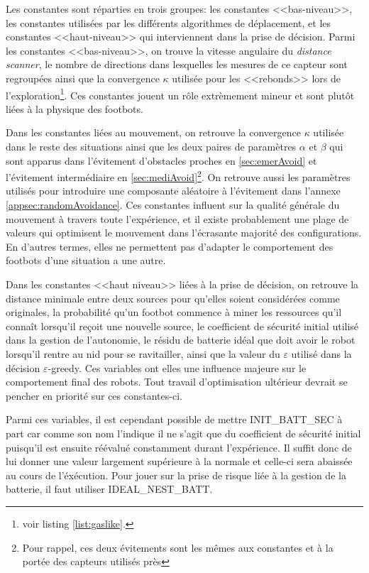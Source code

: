Les constantes sont réparties en trois groupes: les constantes <<bas-niveau>>, les constantes utilisées par les différents algorithmes de déplacement, et les constantes <<haut-niveau>> qui interviennent dans la prise de décision. Parmi les constantes <<bas-niveau>>, on trouve la vitesse angulaire du \emph{distance scanner}, le nombre de directions dans lesquelles les mesures de ce capteur sont regroupées ainsi que la convergence $\kappa$ utilisée pour les <<rebonds>> lors de l'exploration\footnote{voir listing \ref{list:gaslike}.}. Ces constantes jouent un rôle extrèmement mineur et sont plutôt liées à la physique des footbots.

Dans les constantes liées au mouvement, on retrouve la convergence $\kappa$ utilisée dans le reste des situations ainsi que les deux paires de paramètres $\alpha$ et $\beta$ qui sont apparus dans l'évitement d'obstacles proches en \ref{sec:emerAvoid} et l'évitement intermédiaire en \ref{sec:mediAvoid}\footnote{Pour rappel, ces deux évitements sont les mêmes aux constantes et à la portée des capteurs utilisés près}. On retrouve aussi les paramètres utilisés pour introduire une composante aléatoire à l'évitement dans l'annexe \ref{appsec:randomAvoidance}. Ces constantes influent sur la qualité générale du mouvement à travers toute l'expérience, et il existe probablement une plage de valeurs qui optimisent le mouvement dans l'écrasante majorité des configurations. En d'autres termes, elles ne permettent pas d'adapter le comportement des footbots d'une situation a une autre.

Dans les constantes <<haut niveau>> liées à la prise de décision, on retrouve la distance minimale entre deux sources pour qu'elles soient considérées comme originales, la probabilité qu'un footbot commence à miner les ressources qu'il connaît lorsqu'il reçoit une nouvelle source, le coefficient de sécurité initial utilisé dans la gestion de l'autonomie, le résidu de batterie idéal que doit avoir le robot lorsqu'il rentre au nid pour se ravitailler, ainsi que la valeur du $\varepsilon$ utilisé dans la décision $\varepsilon$-greedy. Ces variables ont elles une influence majeure sur le comportement final des robots. Tout travail d'optimisation ultérieur devrait se pencher en priorité sur ces constantes-ci.

Parmi ces variables, il est cependant possible de mettre {\ttfamily INIT\_BATT\_SEC} à part car comme son nom l'indique il ne s'agit que du coefficient de sécurité initial puisqu'il est ensuite réévalué constamment durant l'expérience. Il suffit donc de lui donner une valeur largement supérieure à la normale et celle-ci sera abaissée au cours de l'éxécution. Pour jouer sur la prise de risque liée à la gestion de la batterie, il faut utiliser {\ttfamily IDEAL\_NEST\_BATT}.

